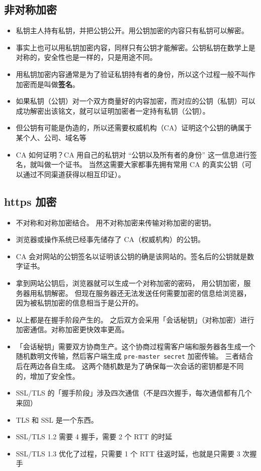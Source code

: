 
\subsection{非对称加密}
\begin{itemize}
\item 私钥主人持有私钥，并把公钥公开。用公钥加密的内容只有私钥可以解密。
\item 事实上也可以用私钥加密内容，同样只有公钥才能解密。公钥私钥在数学上是对称的，安全性也是一样的，只是用途不同。
\item 用私钥加密内容通常是为了验证私钥持有者的身份，所以这个过程一般不叫作加密而是叫做\textbf{签名}。
\item 如果私钥（公钥）对一个双方商量好的内容加密，而对应的公钥（私钥）可以成功解密出该铭文，就可以证明加密者一定持有私钥（公钥）。
\item 但公钥有可能是伪造的，所以还需要权威机构（CA）证明这个公钥的确属于某个人、公司、域名等
\item CA 如何证明？CA 用自己的私钥对 “公钥以及所有者的身份” 这一信息进行签名，就叫做一个证书。 当然这需要大家都事先拥有常用 CA 的真实公钥（可以通过不同渠道获得以相互印证）。
\end{itemize}

\subsection{https 加密}
\begin{itemize}
\item 不对称和对称加密结合。 用不对称加密来传输对称加密的密钥。
\item 浏览器或操作系统已经事先储存了 CA（权威机构）的公钥。
\item CA 会对网站的公钥签名以证明该公钥的确是该网站的。签名后的公钥就是数字证书。
\item 拿到网站公钥后，浏览器就可以生成一个对称加密的密码， 用公钥加密，服务器用私钥解密。 但现在服务器还无法发送任何需要加密的信息给浏览器，因为被私钥加密的信息相当于是公开的。
\item 以上都是在握手阶段产生的。 之后双方会采用「会话秘钥」（对称加密）进行加密通信。对称加密更快效率更高。
\item 「会话秘钥」需要双方协商生产。这个协商过程需客户端和服务器各生成一个随机数明文传输，然后客户端生成 \verb`pre-master secret` 加密传输。 三者结合后在两边各自生成。 这两个随机数是为了确保每一次会话的密钥都是不同的，增加了安全性。
\item SSL/TLS 的「握手阶段」涉及四次通信（不是四次握手，每次通信都有几个来回）
\item TLS 和 SSL 是一个东西。
\item SSL/TLS 1.2 需要 4 握手，需要 2 个 RTT 的时延
\item SSL/TLS 1.3 优化了过程，只需要 1 个 RTT 往返时延，也就是只需要 3 次握手
\end{itemize}
